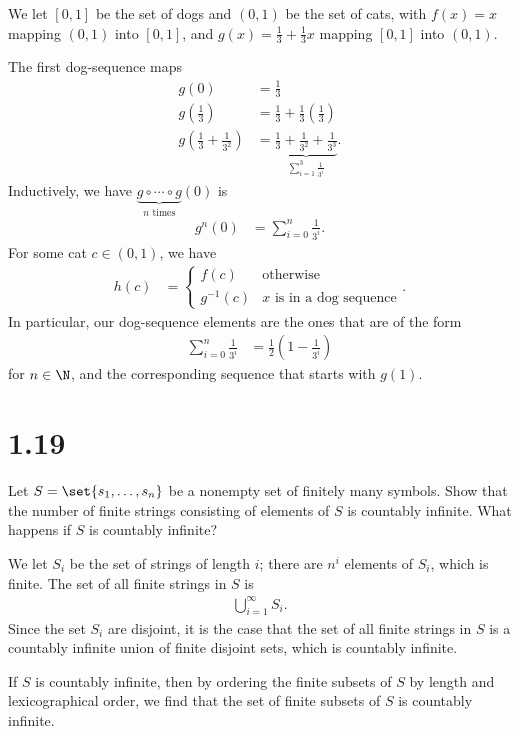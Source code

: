 \documentclass[10pt]{mypackage}
\begin{document}
{
  \color{blue}
  \begin{solution}
    We let $[0,1]$ be the set of dogs and $(0,1)$ be the set of cats, with $f(x) = x$ mapping $(0,1)$ into $[0,1]$, and $g(x) = \frac{1}{3} + \frac{1}{3}x$ mapping $[0,1]$ into $(0,1)$.\newline

    The first dog-sequence maps
    \begin{align*}
      g(0) &= \frac{1}{3}\\
      g\left(\frac{1}{3}\right) &= \frac{1}{3} + \frac{1}{3}\left(\frac{1}{3}\right)\\
      g\left(\frac{1}{3} + \frac{1}{3^2}\right) &= \underbrace{\frac{1}{3} + \frac{1}{3^2} + \frac{1}{3^3}}_{\sum_{i=1}^{3}\frac{1}{3^i}}.
    \end{align*}
    Inductively, we have $\underbrace{g\circ\cdots\circ g}_{n\text{ times}}(0)$ is
    \begin{align*}
      g^{n}\left(0\right) &= \sum_{i=0}^{n}\frac{1}{3^i}.
    \end{align*}
    For some cat $c\in (0,1)$, we have
    \begin{align*}
      h(c) &= \begin{cases}
        f(c) & \text{otherwise}\\
        g^{-1}\left(c\right) & \text{$x$ is in a dog sequence}
      \end{cases}.
    \end{align*}
    In particular, our dog-sequence elements are the ones that are of the form
    \begin{align*}
      \sum_{i=0}^{n}\frac{1}{3^i} &= \frac{1}{2}\left(1-\frac{1}{3^i}\right)
    \end{align*}
    for $n\in\N$, and the corresponding sequence that starts with $g(1)$.
  \end{solution}
}
\section{1.19}%
\begin{problem}
  Let $S = \set{s_1,\dots,s_n}$ be a nonempty set of finitely many symbols. Show that the number of finite strings consisting of elements of $S$ is countably infinite. What happens if $S$ is countably infinite?
\end{problem}
\begin{solution}
  We let $S_i$ be the set of strings of length $i$; there are $n^i$ elements of $S_i$, which is finite. The set of all finite strings in $S$ is
  \begin{align*}
    \bigcup_{i=1}^{\infty}S_i.
  \end{align*}
  Since the set $S_i$ are disjoint, it is the case that the set of all finite strings in $S$ is a countably infinite union of finite disjoint sets, which is countably infinite.\newline

  If $S$ is countably infinite, then by ordering the finite subsets of $S$ by length and lexicographical order, we find that the set of finite subsets of $S$ is countably infinite.
\end{solution}
\end{document}
